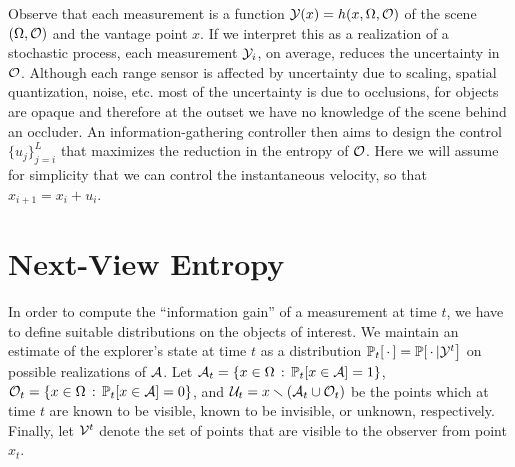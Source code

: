 Observe that each measurement is a
function $\mathcal{Y}(x) = h(x, \Omega, \mathcal{O})$ of the scene $(\Omega, \mathcal{O})$ and the vantage point $x$.
If we interpret
this as a realization of a stochastic process, each measurement
$\mathcal{Y}_i$, on average, reduces the uncertainty in $\mathcal{O}$. Although each
range sensor is affected by uncertainty due to scaling,
spatial quantization, noise, etc. most of the uncertainty
is due to occlusions, for objects are opaque and therefore 
at the outset we have no knowledge of the scene behind 
an occluder. An information-gathering controller
then aims to design the control $\{u_j\}_{j=i}^L$ that maximizes
the reduction in the entropy of $\mathcal{O}$. Here we will assume
for simplicity that we can control the instantaneous 
velocity, so that $x_{i+1} = x_i + u_i$. 


\section{Next-View Entropy}


In order to compute the “information gain” of a measurement at time $t$, we have
to define suitable distributions on the objects of 
interest. 
We maintain an estimate of the explorer's state at time $t$
as a distribution $\mathbb{P}_t[\,\cdot\,] = \mathbb{P}[\,\cdot\,|\mathcal{Y}^t\bigr]$ on possible realizations of $\mathcal{A}$.
Let $\mathcal{A}_t = \{x\in \Omega\,:\, \mathbb{P}_t[x\in\mathcal{A}] = 1\}$,
$\mathcal{O}_t = \{x\in \Omega\,:\, \mathbb{P}_t[x\in\mathcal{A}] = 0\}$,
and $\mathcal{U}_t = x \smallsetminus (\mathcal{A}_t \cup \mathcal{O}_t)$
be the points which at time $t$ are 
known to be visible, known to be invisible, or unknown,
respectively.  Finally, let $\mathcal{V}^t$ denote the set of points that are visible to the observer from point $x_t$.

